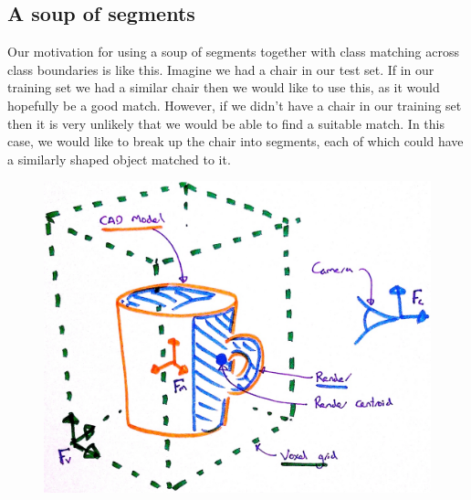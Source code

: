 \documentclass[10pt,a4paper, twocolumn]{article}
\begin{document}
\subsection{A soup of segments}

Our motivation for using a soup of segments together with class matching across class boundaries is like this.
Imagine we had a chair in our test set.
If in our training set we had a similar chair then we would like to use this, as it would hopefully be a good match.
However, if we didn't have a chair in our training set then it is very unlikely that we would be able to find a suitable match.
In this case, we would like to break up the chair into segments, each of which could have a similarly shaped object matched to it.


\begin{figure}
	\centering%
	\includegraphics[width=1.0\linewidth]{voxel_coordinates}%
	\label{fig:voxel_coordinates}%
\end{figure}
\end{document}
